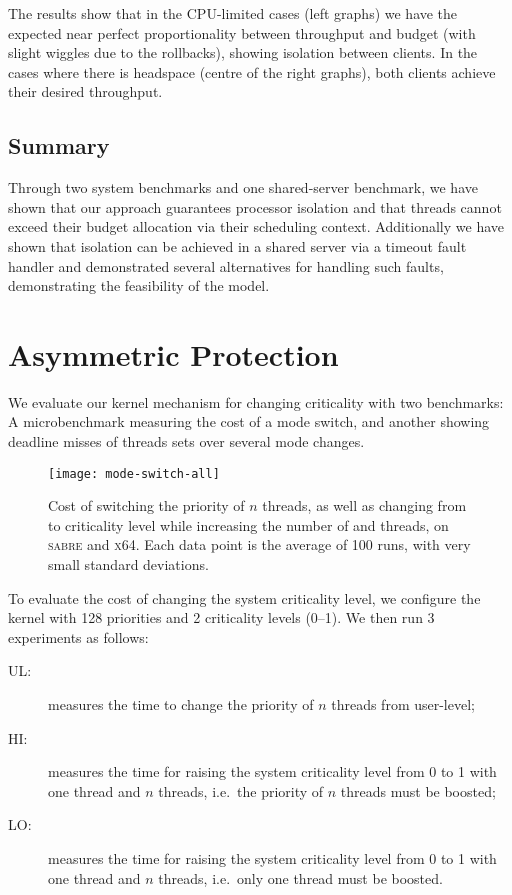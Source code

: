 The results show that in the CPU-limited cases (left graphs)
we have the expected near perfect proportionality between throughput and
budget (with slight wiggles due to the rollbacks), showing isolation between clients. In the cases where there is headspace (centre of the right
graphs), both clients achieve their desired throughput.

\subsection{Summary}

Through two system benchmarks and one shared-server benchmark, we have shown that our approach
guarantees processor isolation and that threads cannot exceed their budget allocation via their
scheduling context. Additionally we have shown that isolation can be achieved in a shared server via
a timeout fault handler and demonstrated several alternatives for handling such faults,
demonstrating the feasibility of the model. 

\section{Asymmetric Protection}

We evaluate our kernel mechanism for changing criticality
with two benchmarks: A
microbenchmark measuring the cost of a mode switch, and another showing deadline misses of threads sets over several mode changes.

\begin{figure}[t]
  \centering
  \texttt{[image: mode-switch-all]}
  \caption{Cost of switching the priority of $n$ threads, as well as changing from  to
   criticality level while increasing the number of  and  threads,
  on \textsc{sabre} and \textsc{x64}. Each data point is the average of 100 runs, with very small standard
  deviations.}
  \label{f:mode-switch}
\end{figure}

To evaluate the cost of changing the system criticality level, we
configure the kernel with 128 priorities and 2 criticality levels
(0--1). We then  run 3 experiments as follows:
\begin{description}
    \item[\textsc{UL}:] measures the time to change the priority of $n$ threads from user-level;
    \item[\textsc{HI}:] measures the time for raising the system criticality level from 0 to 1 with one  thread and $n$
     threads, i.e.\ the priority of $n$ threads must be boosted;
\item[\textsc{LO}:] measures the time for raising the system criticality level from 0 to 1 with one  thread and
    $n$  threads, i.e.\ only one thread must be boosted.
\end{description}

